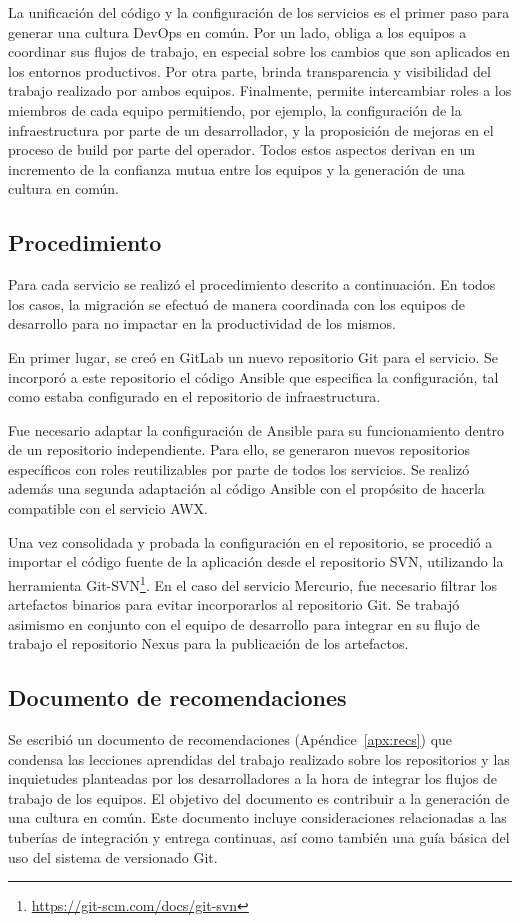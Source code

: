 La unificación del código y la configuración de los servicios es el
primer paso para generar una cultura DevOps en común. Por un lado,
obliga a los equipos a coordinar sus flujos de trabajo, en especial
sobre los cambios que son aplicados en los entornos productivos. Por
otra parte, brinda transparencia y visibilidad del trabajo realizado
por ambos equipos. Finalmente, permite intercambiar roles a los
miembros de cada equipo permitiendo, por ejemplo, la configuración de
la infraestructura por parte de un desarrollador, y la proposición de
mejoras en el proceso de build por parte del operador. Todos estos
aspectos derivan en un incremento de la confianza mutua entre los
equipos y la generación de una cultura en común.
%
\subsection{Procedimiento}
%
Para cada servicio se realizó el procedimiento descrito a
continuación. En todos los casos, la migración se efectuó de manera
coordinada con los equipos de desarrollo para no impactar en la
productividad de los mismos.

En primer lugar, se creó en GitLab un nuevo repositorio Git para el
servicio. Se incorporó a este repositorio el código Ansible que
especifica la configuración, tal como estaba configurado en el
repositorio de infraestructura.

Fue necesario adaptar la configuración de Ansible para su
funcionamiento dentro de un repositorio independiente. Para ello, se
generaron nuevos repositorios específicos con roles reutilizables por
parte de todos los servicios. Se realizó además una segunda adaptación
al código Ansible con el propósito de hacerla compatible con el
servicio AWX.

Una vez consolidada y probada la configuración en el repositorio, se
procedió a importar el código fuente de la aplicación desde el
repositorio SVN, utilizando la herramienta
Git-SVN\footnote{\url{https://git-scm.com/docs/git-svn}}. En el caso
del servicio Mercurio, fue necesario filtrar los artefactos binarios
para evitar incorporarlos al repositorio Git. Se trabajó asimismo en
conjunto con el equipo de desarrollo para integrar en su flujo de
trabajo el repositorio Nexus para la publicación de los artefactos.
%
\subsection{Documento de recomendaciones}
%
Se escribió un documento de recomendaciones (Apéndice~\ref{apx:recs})
que condensa las lecciones aprendidas del trabajo realizado sobre los
repositorios y las inquietudes planteadas por los desarrolladores a la
hora de integrar los flujos de trabajo de los equipos. El objetivo del
documento es contribuir a la generación de una cultura en común. Este
documento incluye consideraciones relacionadas a las tuberías de
integración y entrega continuas, así como también una guía básica del
uso del sistema de versionado Git.
%
%
